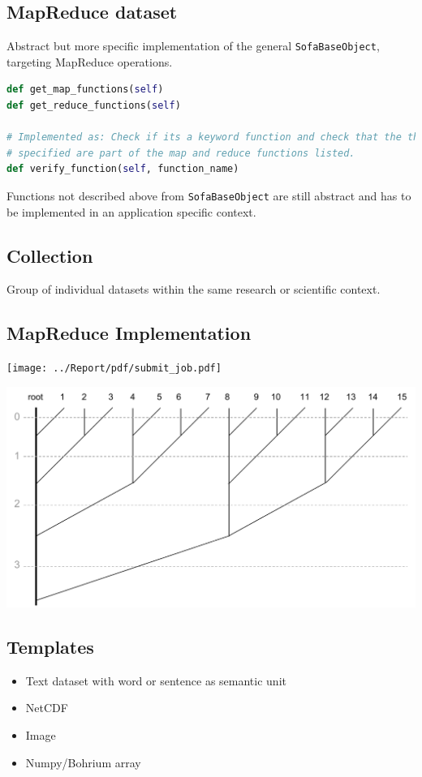 \documentclass[paper=128mm:96mm, fontsize=11pt, pagesize, parskip=half-,]{scrartcl}
\theoremstyle{definition}
\newenvironment{Figure}
  {\par\medskip\noindent\minipage{\linewidth}}
  {\endminipage\par\medskip}
\newcommand*{\centerinpage}[1]{
	\null \vfill
	\begin{Figure}
		\centering	
		#1	
	\end{Figure}
	\vfill \null}
\newcommand*{\newslide}{\clearpage}
\begin{document}
\subsection{MapReduce dataset}
Abstract but more specific implementation of the general \texttt{SofaBaseObject}, targeting MapReduce operations.
\vspace*{2mm}
\begin{lstlisting}[language=Python, basicstyle=\ttfamily\tiny, numbers=none]
def get_map_functions(self)
def get_reduce_functions(self)

# Implemented as: Check if its a keyword function and check that the the functions
# specified are part of the map and reduce functions listed.
def verify_function(self, function_name)
\end{lstlisting}
\vspace*{-3mm}
\footnotesize{Functions not described above from \texttt{SofaBaseObject} are still abstract and has to be implemented in an application specific context.}

\subsection{Collection}
Group of individual datasets within the same research or scientific context.
\newslide

\subsection{MapReduce Implementation}
\vspace*{-6mm}
\centerinpage{\texttt{[image: ../Report/pdf/submit\_job.pdf]}}

\centerinpage{\includegraphics[scale=0.45]{../Report/pdf/reduction_tree.pdf}}
\newslide

\subsection{Templates}
\begin{itemize}
	\item Text dataset with word or sentence as semantic unit
	\item NetCDF
	\item Image
	\item Numpy/Bohrium array
\end{itemize}
\end{document}
